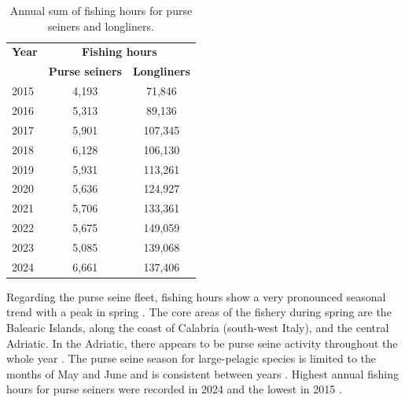 \begin{table}[ht]
	\centering
	\caption{Annual sum of fishing hours for purse seiners and longliners.}
	\medskip
	\begin{tabular}{lcc}
		\toprule
		\textbf{Year} & \multicolumn{2}{c}{\textbf{Fishing hours}}                       \\
		\cmidrule(lr){2-3}
		              & \textbf{Purse seiners}                     & \textbf{Longliners} \\
		\midrule
		2015          & 4,193                                      & 71,846              \\
		2016          & 5,313                                      & 89,136              \\
		2017          & 5,901                                      & 107,345             \\
		2018          & 6,128                                      & 106,130             \\
		2019          & 5,931                                      & 113,261             \\
		2020          & 5,636                                      & 124,927             \\
		2021          & 5,706                                      & 133,361             \\
		2022          & 5,675                                      & 149,059             \\
		2023          & 5,085                                      & 139,068             \\
		2024          & 6,661                                      & 137,406             \\
		\bottomrule
	\end{tabular}
	\label{tab:year_hours}
\end{table}

Regarding the purse seine fleet, fishing hours show a very pronounced seasonal trend with a peak in
spring . The core areas of the fishery during spring are the Balearic
Islands, along the coast of Calabria (south-west Italy), and the central Adriatic. In the Adriatic,
there appears to be purse seine activity throughout the whole year .
The purse seine season for large-pelagic species is limited to the months of May and June and is
consistent between years . Highest annual fishing hours for purse
seiners were recorded in 2024 and the lowest in 2015 .

